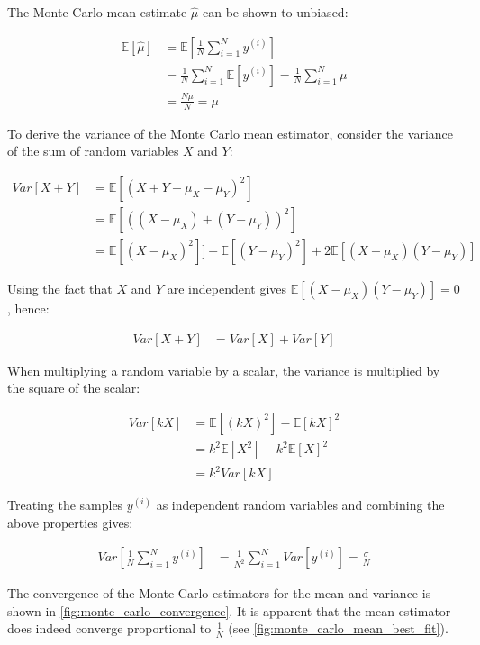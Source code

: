 \documentclass[a4paper]{article}
\begin{document}
The Monte Carlo mean estimate $\hat{\mu}$ can be shown to unbiased:

\begin{align*}
    \mathbb{E}[\hat{\mu}] & = \mathbb{E}\left[\frac{1}{N} \sum_{i=1}^N y^{(i)}\right] \\
    &= \frac{1}{N} \sum_{i=1}^N \mathbb{E}\left[y^{(i)}\right] = \frac{1}{N} \sum_{i=1}^N \mu \\
    &= \frac{N\mu}{N} = \mu
\end{align*}

To derive the variance of the Monte Carlo mean estimator, consider the variance of the sum of random variables $X$ and
$Y$:

\begin{align*}
    Var[X+Y]
    &= \mathbb{E}\left[(X + Y - \mu_X - \mu_Y)^2\right] \\
    &= \mathbb{E}\left[((X - \mu_X) + (Y - \mu_Y))^2\right] \\
    &= \mathbb{E}\left[(X-\mu_X)^2\right]] + \mathbb{E}\left[(Y-\mu_Y)^2\right] + 2\mathbb{E}\left[(X-\mu_X)(Y-\mu_Y)\right]
\end{align*}

Using the fact that $X$ and $Y$ are independent gives $\mathbb{E}\left[(X-\mu_X)(Y-\mu_Y)\right] = 0$, hence:

\begin{align*}
    Var[X+Y] & = Var[X] + Var[Y]
\end{align*}

When multiplying a random variable by a scalar, the variance is multiplied by the square of the scalar:

\begin{align*}
    Var[kX]
    &= \mathbb{E}\left[(kX)^2\right] - \mathbb{E}[kX]^2 \\
    &= k^2 \mathbb{E}\left[X^2\right] - k^2\mathbb{E}[X]^2 \\
    &= k^2 Var[kX]
\end{align*}

Treating the samples $y^{(i)}$ as independent random variables and combining the above properties gives:

\begin{align*}
    Var\left[ \frac{1}{N}\sum_{i=1}^N y^{(i)} \right] &= \frac{1}{N^2} \sum_{i=1}^N Var\left[y^{(i)}\right] = \frac{\sigma}{N}
\end{align*}

The convergence of the Monte Carlo estimators for the mean and variance is shown in \autoref{fig:monte_carlo_convergence}.
It is apparent that the mean estimator does indeed converge proportional to $\frac{1}{N}$
(see \autoref{fig:monte_carlo_mean_best_fit}).
\end{document}
